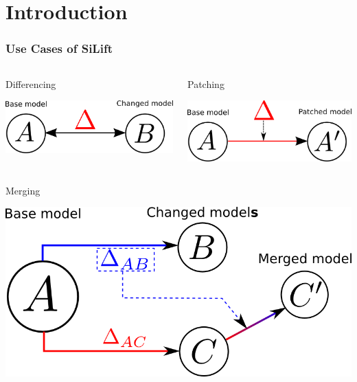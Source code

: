 \section{Introduction}
\begin{frame}
\frametitle{Use Cases of SiLift}
\begin{columns}[t]
\begin{column}{0.5\textwidth}
\begin{block}{Differencing}
  \begin{center}
\includegraphics[scale=0.47]{images/createPatch}
  \end{center}
\end{block}
\end{column}
\begin{column}{0.5\textwidth}
\begin{block}{Patching}
  \begin{center}
\includegraphics[scale=0.41]{images/applyPatch}
  \end{center}
\end{block}
\end{column}
 \end{columns}

\begin{block}{Merging}
  \begin{center}
\includegraphics[scale=0.55]{images/applyPatchMerge}
  \end{center}
\end{block}
\end{frame}
